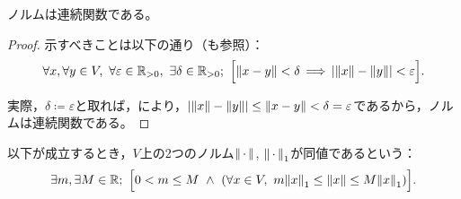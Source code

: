 \documentclass[b5paper,draft,oneside,openany]{ltjsbook} %
\begin{document}
\begin{prop}[ノルムの連続性]
    ノルムは連続関数である。
    \begin{proof}
        示すべきことは以下の通り（も参照）：
        \begin{equation}
            \forall x,\forall y\in V,\ \forall \varepsilon\in\Rposi,\
                \exists \delta\in \Rposi;\ \bsqu{
                    \norm{x-y}<\delta\, \Longrightarrow\, \abs{\norm{x}-\norm{y}}<\varepsilon
                }.
        \end{equation}

        実際，$\delta\coloneqq \varepsilon$と取れば，により，$\abs{\norm{x}-\norm{y}}\leq \norm{x-y}<\delta =\varepsilon$であるから，ノルムは連続関数である。
    \end{proof}
\end{prop}

\begin{defi}[ノルムの同値性]
    以下が成立するとき，$V$上の2つのノルム$\norm{\dummy}$, $\norm{\dummy}_1$が同値であるという：
    \begin{equation}
        \exists m, \exists M\in\R;\ \bsqu{0<m\leq M\ \land \ \pare{
            \forall x\in V,\ m\norm{x}_1 \leq \norm{x} \leq M\norm{x}_1
        }}.
    \end{equation}
\end{defi}
\end{document}
